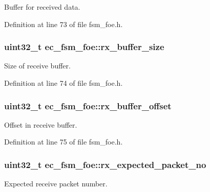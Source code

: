 \-Buffer for received data. 



\-Definition at line 73 of file fsm\-\_\-foe.\-h.

\subsubsection[{rx\-\_\-buffer\-\_\-size}]{\setlength{\rightskip}{0pt plus 5cm}uint32\-\_\-t {\bf ec\-\_\-fsm\-\_\-foe\-::rx\-\_\-buffer\-\_\-size}}\label{structec__fsm__foe_ad44c7d17687802d770d8c455caa2e490}


\-Size of receive buffer. 



\-Definition at line 74 of file fsm\-\_\-foe.\-h.

\subsubsection[{rx\-\_\-buffer\-\_\-offset}]{\setlength{\rightskip}{0pt plus 5cm}uint32\-\_\-t {\bf ec\-\_\-fsm\-\_\-foe\-::rx\-\_\-buffer\-\_\-offset}}\label{structec__fsm__foe_a92ba79d9ab8dfcb3a57ff98e05450a85}


\-Offset in receive buffer. 



\-Definition at line 75 of file fsm\-\_\-foe.\-h.

\subsubsection[{rx\-\_\-expected\-\_\-packet\-\_\-no}]{\setlength{\rightskip}{0pt plus 5cm}uint32\-\_\-t {\bf ec\-\_\-fsm\-\_\-foe\-::rx\-\_\-expected\-\_\-packet\-\_\-no}}\label{structec__fsm__foe_a6497d12beaa6dba428a4014579a5515f}


\-Expected receive packet number. 



